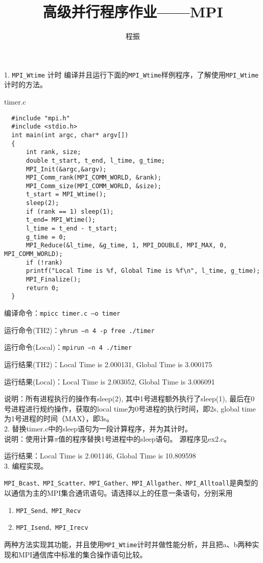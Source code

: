 \documentclass{ctexart}
\author{程振}
\title{高级并行程序作业——MPI}
\begin{document}
\maketitle

1. \lstinline{MPI_Wtime} 计时
编译并且运行下面的\lstinline{MPI_Wtime}样例程序，了解使用\lstinline{MPI_Wtime}计时的方法。

timer.c
\lstset{language=C}
\begin{lstlisting}
  #include "mpi.h"
  #include <stdio.h>
  int main(int argc, char* argv[])
  {
      int rank, size;
      double t_start, t_end, l_time, g_time;
      MPI_Init(&argc,&argv);
      MPI_Comm_rank(MPI_COMM_WORLD, &rank);
      MPI_Comm_size(MPI_COMM_WORLD, &size);
      t_start = MPI_Wtime();
      sleep(2);
      if (rank == 1) sleep(1);
      t_end= MPI_Wtime();
      l_time = t_end - t_start;
      g_time = 0;
      MPI_Reduce(&l_time, &g_time, 1, MPI_DOUBLE, MPI_MAX, 0, MPI_COMM_WORLD);
      if (!rank) 
      printf("Local Time is %f, Global Time is %f\n", l_time, g_time);
      MPI_Finalize();
      return 0;
  }
\end{lstlisting}

编译命令：\lstinline{mpicc timer.c –o timer}

运行命令(TH2)：\lstinline{yhrun –n 4 -p free ./timer}

运行命令(Local)：\lstinline{mpirun –n 4 ./timer}

运行结果(TH2)：Local Time is 2.000131, Global Time is 3.000175

运行结果(Local)：Local Time is 2.003052, Global Time is 3.006091

说明：所有进程执行的操作有sleep(2), 其中1号进程额外执行了sleep(1),
最后在0号进程进行规约操作，获取的local time为0号进程的执行时间，即2s,
global time为1号进程的时间（MAX），即3s。
\\

2. 替换timer.c中的sleep语句为一段计算程序，并为其计时。
\\

说明：使用计算$\pi$值的程序替换1号进程中的sleep语句。
源程序见ex2.c。

运行结果：Local Time is 2.001146, Global Time is 10.809598
\\

3. 编程实现。

\lstinline{MPI_Bcast、MPI_Scatter、MPI_Gather、MPI_Allgather、MPI_Alltoall}是典型的以通信为主的MPI集合通讯语句。请选择以上的任意一条语句，分别采用
\begin{enumerate}[label=(\alph*)]
    \item \lstinline{MPI_Send、MPI_Recv}
    \item \lstinline{MPI_Isend、MPI_Irecv}
\end{enumerate}
两种方法实现其功能，并且使用\lstinline{MPI_Wtime}计时并做性能分析，并且把a、b两种实现和MPI通信库中标准的集合操作语句比较。
\end{document}
